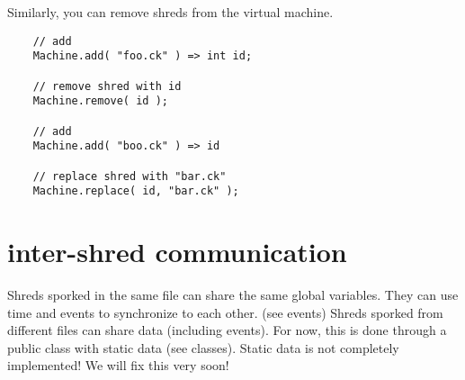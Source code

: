 Similarly, you can remove shreds from the virtual machine.
\begin{verbatim}
    // add
    Machine.add( "foo.ck" ) => int id;

    // remove shred with id
    Machine.remove( id );

    // add
    Machine.add( "boo.ck" ) => id

    // replace shred with "bar.ck"
    Machine.replace( id, "bar.ck" );
\end{verbatim}
 

\section{inter-shred communication}

Shreds sporked in the same file can share the same global variables. They can use time and events to synchronize to each other. (see events) Shreds sporked from different files can share data (including events). For now, this is done through a public class with static data (see  classes). Static data is not completely implemented! We will fix this very soon!
